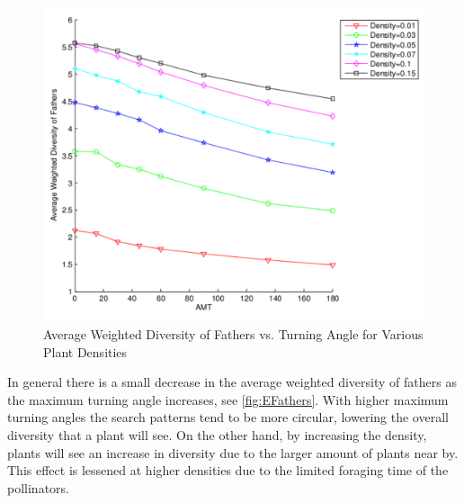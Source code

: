 \begin{figure}
  \begin{center}
  \includegraphics[scale=0.5]{WDFvsAMT.pdf}
  \end{center}
  \caption{\small Average Weighted Diversity of Fathers vs. Turning Angle for Various Plant Densities}
  \label{fig:EFathers}
\end{figure}

In general there is a small decrease in the average weighted diversity of
fathers as the maximum turning angle increases, see \autoref{fig:EFathers}. With
higher maximum turning angles the search patterns tend to be more circular,
lowering the overall diversity that a plant will see.  On the other hand, by
increasing the density, plants will see an increase in diversity due to the
larger amount of plants near by.  This effect is lessened at higher densities
due to the limited foraging time of the pollinators.
